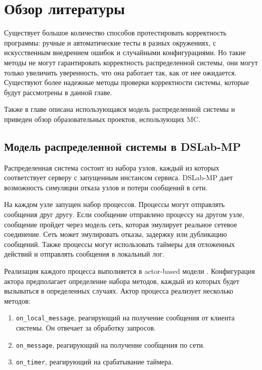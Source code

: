 \documentclass[a4paper,12pt]{extarticle}
\newcommand{\mc}[0]{MC}
\begin{document}
\section{Обзор литературы}
\label{CHAPTER2}

Существует большое количество способов протестировать корректность программы: ручные и автоматические тесты в разных окружениях, с искусственным внедрением ошибок и случайными конфигурациями.
Но такие методы не могут гарантировать корректность распределенной системы, они могут только увеличить уверенность, что она работает так, как от нее ожидается.
Существуют более надежные методы проверки корректности системы, которые будут рассмотрены в данной главе.

Также в главе описана использующаяся модель распределенной системы и приведен обзор образовательных проектов, использующих \mc.

\subsection{Модель распределенной системы в DSLab-MP}

Распределенная система состоит из набора узлов, каждый из которых соответствует серверу с запущенным инстансом сервиса.
DSLab-MP дает возможность симуляции отказа узлов и потери сообщений в сети.

На каждом узле запущен набор процессов.
Процессы могут отправлять сообщения друг другу.
Если сообщение отправлено процессу на другом узле, сообщение пройдет через модель сеть, которая эмулирует реальное сетевое соединение.
Сеть может эмулировать отказы, задержку или дубликацию сообщений.
Также процессы могут использовать таймеры для отложенных действий и отправлять сообщения в локальный лог.

Реализация каждого процесса выполняется в actor-based модели \cite{b21}.
Конфигурация актора предполагает определение набора методов, каждый из которых будет вызываться в определенных случаях.
Актор процесса реализует несколько методов:

\begin{enumerate}
\item \texttt{on\_local\_message}, реагирующий на получение сообщения от клиента системы. Он отвечает за обработку запросов.
\item \texttt{on\_message}, реагирующий на получение сообщения по сети.
\item \texttt{on\_timer}, реагирующий на срабатывание таймера.
\end{enumerate}
\end{document}
